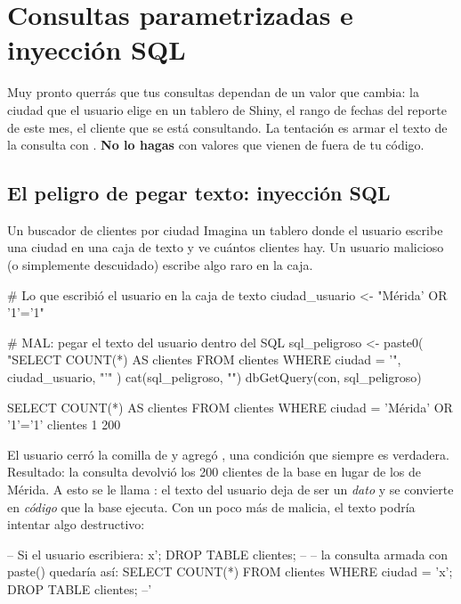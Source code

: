 \section{Consultas parametrizadas e inyección SQL}
\label{sec:m5-parametros}

Muy pronto querrás que tus consultas dependan de un valor que cambia: la
ciudad que el usuario elige en un tablero de Shiny, el rango de fechas del
reporte de este mes, el cliente que se está consultando. La tentación es
armar el texto de la consulta con . \textbf{No lo hagas}
con valores que vienen de fuera de tu código.

\subsection{El peligro de pegar texto: inyección SQL}

\begin{ejemplo}{Un buscador de clientes por ciudad}
Imagina un tablero donde el usuario escribe una ciudad en una caja de texto
y ve cuántos clientes hay. Un usuario malicioso (o simplemente descuidado)
escribe algo raro en la caja.
\end{ejemplo}

\begin{rcode}
# Lo que escribió el usuario en la caja de texto
ciudad_usuario <- "Mérida' OR '1'='1"

# MAL: pegar el texto del usuario dentro del SQL
sql_peligroso <- paste0(
  "SELECT COUNT(*) AS clientes FROM clientes WHERE ciudad = '",
  ciudad_usuario, "'"
)
cat(sql_peligroso, "\n")
dbGetQuery(con, sql_peligroso)
\end{rcode}

\begin{rsalida}
SELECT COUNT(*) AS clientes FROM clientes WHERE ciudad = 'Mérida' OR '1'='1' 
  clientes
1      200
\end{rsalida}

El usuario cerró la comilla de  y agregó
, una condición que siempre es verdadera. Resultado: la
consulta devolvió los 200 clientes de la base en lugar de los de Mérida. A
esto se le llama : el texto del usuario deja de ser
un \emph{dato} y se convierte en \emph{código} que la base ejecuta. Con un
poco más de malicia, el texto podría intentar algo destructivo:

\begin{sqlcode}
-- Si el usuario escribiera:   x'; DROP TABLE clientes; --
-- la consulta armada con paste() quedaría así:
SELECT COUNT(*) FROM clientes WHERE ciudad = 'x'; DROP TABLE clientes; --'
\end{sqlcode}

